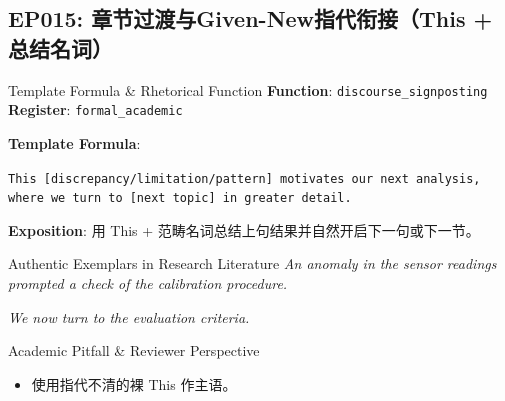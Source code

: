 \subsection{EP015: 章节过渡与Given-New指代衔接（This + 总结名词）}\label{sec:ep:EP015}
\begin{ConceptBox}{Template Formula \& Rhetorical Function}
\textbf{Function}: \texttt{discourse\_signposting} \quad \textbf{Register}: \texttt{formal\_academic}\par\vspace{3pt}
\textbf{Template Formula}:\par\noindent\texttt{This [discrepancy/limitation/pattern] motivates our next analysis, where we turn to [next topic] in greater detail.}\par\vspace{4pt}
\textbf{Exposition}: 用 This + 范畴名词总结上句结果并自然开启下一句或下一节。
\end{ConceptBox}
\begin{ExampleBox}{Authentic Exemplars in Research Literature}
\textit{An anomaly in the sensor readings prompted a check of the calibration procedure.}\par\vspace{2pt}
\textit{We now turn to the evaluation criteria.}\par\vspace{2pt}
\end{ExampleBox}
\begin{TipBox}{Academic Pitfall \& Reviewer Perspective}
\begin{itemize}[leftmargin=1.5em, itemsep=1pt]
  \item 使用指代不清的裸 This 作主语。
\end{itemize}
\end{TipBox}
\vspace{6pt}
